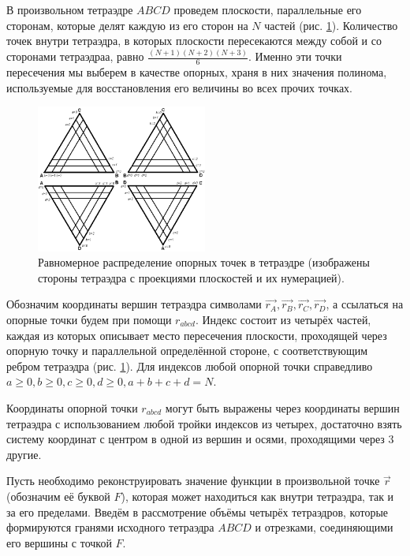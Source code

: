 В произвольном тетраэдре $ABCD$ проведем плоскости, параллельные его сторонам, которые делят каждую из его сторон на $N$ частей (рис. \ref{pic:tetr-interpolation-base-points}). Количество точек внутри тетраэдра, в которых плоскости пересекаются между собой и со сторонами тетраэдраа, равно $\frac{(N+1)(N+2)(N+3)}{6}$. Именно эти точки пересечения мы выберем в качестве опорных, храня в них значения полинома, используемые для восстановления его величины во всех прочих точках.

\begin{figure}[h]
\centering
\includegraphics[width=0.5\textwidth]{png/tetr-interpolation-base-points.png}
\caption{Равномерное распределение опорных точек в тетраэдре (изображены стороны тетраэдра с проекциями плоскостей и их нумерацией).}
\label{pic:tetr-interpolation-base-points}
\end{figure}

Обозначим координаты вершин тетраэдра символами $\vec{r_A}, \vec{r_B}, \vec{r_C}, \vec{r_D}$, а ссылаться на опорные точки будем при помощи $r_{abcd}$. Индекс состоит из четырёх частей, каждая из которых описывает место пересечения плоскости, проходящей через опорную точку и параллельной определённой стороне, с соответствующим ребром тетраэдра (рис. \ref{pic:tetr-interpolation-base-points}). Для индексов любой опорной точки справедливо $a \ge 0, b \ge 0, c \ge 0, d \ge 0, a+b+c+d = N$.

Координаты опорной точки $r_{abcd}$ могут быть выражены через координаты вершин тетраэдра с использованием любой тройки индексов из четырех, достаточно взять систему координат с центром в одной из вершин и осями, проходящими через 3 другие.

Пусть необходимо реконструировать значение функции в произвольной точке $\vec{r}$ (обозначим её буквой $F$), которая может находиться как внутри тетраэдра, так и за его пределами. Введём в рассмотрение объёмы четырёх тетраэдров, которые формируются гранями исходного тетраэдра $ABCD$ и отрезками, соединяющими его вершины с точкой $F$.

